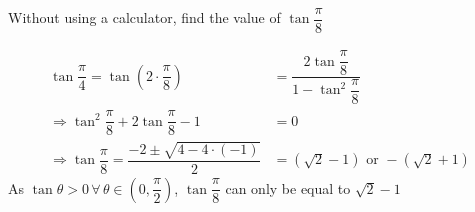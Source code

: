
%
%
%
%
% 
% 

\question[3] Without using a calculator, find the value of $\tan\dfrac{\pi}{8}$


\ifprintanswers
\fi 

\begin{solution}[\halfpage]
	\begin{align}
		\tan\dfrac{\pi}{4} = \tan \left(2\cdot\dfrac{\pi}{8}\right) &= \dfrac{2\tan\dfrac{\pi}{8}}{1-\tan^2\dfrac{\pi}{8}} \\
		\Rightarrow \tan^2\dfrac{\pi}{8} + 2\tan\dfrac{\pi}{8} - 1 &= 0 \\
		\Rightarrow\tan\dfrac{\pi}{8} = \dfrac{-2 \pm \sqrt{4 - 4\cdot(-1)}}{2} &= (\sqrt{2}-1)\text{ or }-(\sqrt{2}+1)
	\end{align}
	As $\tan\theta > 0 \,\forall \,\theta \in (0,\dfrac{\pi}{2})$, $\tan\dfrac{\pi}{8}$ can only be equal to
	$\sqrt{2}-1$
\end{solution}

